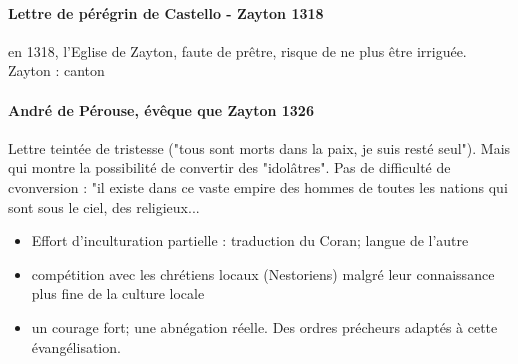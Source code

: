 \paragraph{Lettre de pérégrin de Castello - Zayton 1318} en 1318, l'Eglise de Zayton, faute de prêtre, risque de ne plus être irriguée. Zayton : canton

\paragraph{André de Pérouse, évêque que Zayton 1326} Lettre teintée de tristesse ("tous sont morts dans la paix, je suis resté seul"). Mais qui montre la possibilité de convertir des "idolâtres". Pas de difficulté de cvonversion : "il existe dans ce vaste empire des hommes de toutes les nations qui sont sous le ciel, des religieux...


\begin{Synthesis}
\begin{itemize}
\item  Effort d'inculturation partielle : traduction du Coran; langue de l'autre
\item  compétition avec les chrétiens locaux (Nestoriens) malgré leur connaissance plus fine de la culture locale
\item un courage fort; une abnégation réelle. Des ordres précheurs adaptés à cette évangélisation.

\end{itemize}


\end{Synthesis}